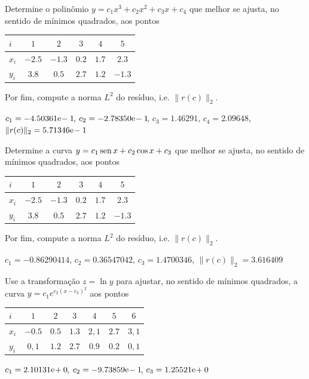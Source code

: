 \begin{exer}
  Determine o polinômio $y = c_1x^3 + c_2x^2 + c_3x + c_4$ que melhor se ajusta, no sentido de mínimos quadrados, aos pontos
  \begin{center}
    \begin{tabular}{l|ccccc}
      $i$ & $1$ & $2$ & $3$ & $4$ & $5$ \\\hline
      $x_i$ & $-2.5$ & $-1.3$ & $0.2$ & $1.7$ & $2.3$\\
      $y_i$ & $3.8$ & $0.5$ & $2.7$ & $1.2$ & $-1.3$\\\hline
    \end{tabular}
  \end{center}
Por fim, compute a norma $L^2$ do resíduo, i.e. $\|r(c)\|_2$.
\end{exer}
\begin{resp}
  $c_1 = -4.50361\mathrm{e}\!-1\!$, $c_2 = -2.78350\mathrm{e}\!-1\!$, $c_3 = 1.46291$, $c_4 = 2.09648$, $\|r(c)\|_2 = 5.71346\mathrm{e}\!-1\!$
\end{resp}

\begin{exer}
  Determine a curva $y = c_1\operatorname{sen} x + c_2\cos x + c_3$ que melhor se ajusta, no sentido de mínimos quadrados, aos pontos
  \begin{center}
    \begin{tabular}{l|ccccc}
      $i$ & $1$ & $2$ & $3$ & $4$ & $5$ \\\hline
      $x_i$ & $-2.5$ & $-1.3$ & $0.2$ & $1.7$ & $2.3$\\
      $y_i$ & $3.8$ & $0.5$ & $2.7$ & $1.2$ & $-1.3$\\\hline
    \end{tabular}
  \end{center}
Por fim, compute a norma $L^2$ do resíduo, i.e. $\|r(c)\|_2$.
\end{exer}
\begin{resp}
  $c_1 = -0.86290414$, $c_2 = 0.36547042$, $c_3 = 1.4700346$, $\|r(c)\|_2 = 3.616409$
\end{resp}

\begin{exer}
  Use a transformação $z = \ln y$ para ajustar, no sentido de mínimos quadrados, a curva $y = c_1e^{c_2(x-c_3)^2}$ aos pontos
  \begin{center}
    \begin{tabular}{l|cccccc}
      $i$ & $1$ & $2$ & $3$ & $4$ & $5$ & $6$ \\\hline
      $x_i$ & $-0.5$ & $0.5$ & $1.3$ & $2,1$ & $2.7$ & $3,1$ \\
      $y_i$ & $0,1$ & $1.2$ & $2.7$ & $0.9$ & $0.2$ & $0,1$ \\\hline
    \end{tabular}
  \end{center}
\end{exer}
\begin{resp}
  $c_1 = 2.10131\mathrm{e}\!+0\!$, $c_2 = -9.73859\mathrm{e}\!-1\!$, $c_3 = 1.25521\mathrm{e}\!+0\!$
\end{resp}

